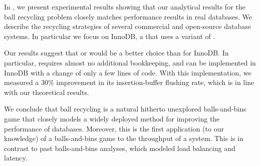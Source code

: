 In , we present experimental results showing that our
analytical results for the ball recycling problem closely matches performance
results in real databases.  We describe the recycling strategies of several
commercial and open-source database systems. In particular we focus on InnoDB,
a \btree{} that uses a variant of \RB.

Our results suggest that \FB or \GG would be a better choice than \RB for
InnoDB. In particular, \GG requires almost no additional bookkeeping, and can
be implemented in InnoDB with a change of only a few lines of code.
With this implementation, we measured a 30\% improvement in its
insertion-buffer flushing rate, which is in line with our theoretical results.

We conclude that ball recycling is a natural hitherto unexplored balls-and-bins
game that closely models a widely deployed method for improving the performance
of databases. Moreover, this is the first application (to our knowledge) of a
balls-and-bins game to the throughput of a system. This is in contrast to past
balls-and-bins analyses, which modeled load balancing and latency.



